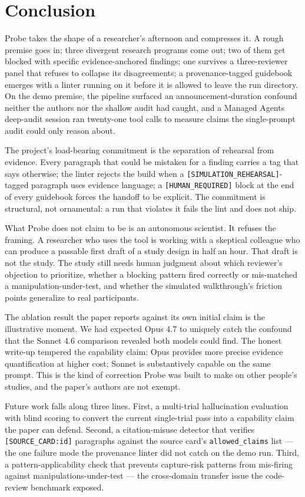 \section{Conclusion}
\label{sec:conclusion}

Probe takes the shape of a researcher's afternoon and compresses it. A rough premise goes in; three divergent research programs come out; two of them get blocked with specific evidence-anchored findings; one survives a three-reviewer panel that refuses to collapse its disagreements; a provenance-tagged guidebook emerges with a linter running on it before it is allowed to leave the run directory. On the demo premise, the pipeline surfaced an announcement-duration confound neither the authors nor the shallow audit had caught, and a Managed Agents deep-audit session ran twenty-one tool calls to measure claims the single-prompt audit could only reason about.

The project's load-bearing commitment is the separation of rehearsal from evidence. Every paragraph that could be mistaken for a finding carries a tag that says otherwise; the linter rejects the build when a \texttt{[SIMULATION\_REHEARSAL]}-tagged paragraph uses evidence language; a \texttt{[HUMAN\_REQUIRED]} block at the end of every guidebook forces the handoff to be explicit. The commitment is structural, not ornamental: a run that violates it fails the lint and does not ship.

What Probe does not claim to be is an autonomous scientist. It refuses the framing. A researcher who uses the tool is working with a skeptical colleague who can produce a passable first draft of a study design in half an hour. That draft is not the study. The study still needs human judgment about which reviewer's objection to prioritize, whether a blocking pattern fired correctly or mis-matched a manipulation-under-test, and whether the simulated walkthrough's friction points generalize to real participants.

The ablation result the paper reports against its own initial claim is the illustrative moment. We had expected Opus 4.7 to uniquely catch the confound that the Sonnet 4.6 comparison revealed both models could find. The honest write-up tempered the capability claim: Opus provides more precise evidence quantification at higher cost; Sonnet is substantively capable on the same prompt. This is the kind of correction Probe was built to make on other people's studies, and the paper's authors are not exempt.

Future work falls along three lines. First, a multi-trial hallucination evaluation with blind scoring to convert the current single-trial pass into a capability claim the paper can defend. Second, a citation-misuse detector that verifies \texttt{[SOURCE\_CARD:id]} paragraphs against the source card's \texttt{allowed\_claims} list --- the one failure mode the provenance linter did not catch on the demo run. Third, a pattern-applicability check that prevents capture-risk patterns from mis-firing against manipulations-under-test --- the cross-domain transfer issue the code-review benchmark exposed.


